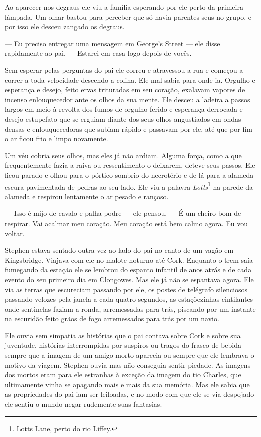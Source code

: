 Ao aparecer nos degraus ele viu a família esperando por ele perto da
primeira lâmpada. Um olhar bastou para perceber que só havia parentes
seus no grupo, e por isso ele desceu zangado os degraus.

 --- Eu preciso entregar uma mensagem em George’s Street --- ele disse rapidamente ao pai. --- Estarei em casa logo depois de vocês.

Sem esperar pelas perguntas do pai ele correu e atravessou a rua e
começou a correr a toda velocidade descendo a colina. Ele mal sabia para onde
ia. Orgulho e esperança e desejo, feito ervas trituradas em seu
coração, exalavam vapores de incenso enlouquecedor ante os olhos da sua
mente. Ele desceu a ladeira a passos largos em meio à revolta dos fumos
de orgulho ferido e esperança derrocada e desejo estupefato que se
erguiam diante dos seus olhos angustiados em ondas densas e
enlouquecedoras que subiam rápido e passavam por ele, até que por fim o
ar ficou frio e limpo novamente.

Um véu cobria seus olhos, mas eles já não ardiam. Alguma força, como a
que frequentemente fazia a raiva ou ressentimento o deixarem, deteve
seus passos. Ele ficou parado e olhou para o pórtico sombrio do
necrotério e de lá para a alameda escura pavimentada de pedras ao seu
lado. Ele viu a palavra \textit{Lotts}\footnote{ Lotts Lane, perto do
rio Liffey.} na parede da alameda e respirou lentamente o ar pesado e
rançoso.

 --- Isso é mijo de cavalo e palha podre --- ele pensou. --- É um cheiro bom de
respirar. Vai acalmar meu coração. Meu coração está bem calmo agora. Eu
vou voltar.

\asterisc

Stephen estava sentado outra vez ao lado do pai no canto de um vagão
em Kingsbridge. Viajava com ele no malote noturno até Cork. Enquanto o
trem saía fumegando da estação ele se lembrou do espanto infantil de
anos atrás e de cada evento do seu primeiro dia em Clongowes. Mas ele
já não se espantava agora. Ele via as terras que escureciam passando
por ele, os postes de telégrafo silenciosos passando velozes pela
janela a cada quatro segundos, as estaçõezinhas cintilantes onde
sentinelas faziam a ronda, arremessadas para trás, piscando por um
instante na escuridão feito grãos de fogo arremessados para trás por um navio.

Ele ouvia sem simpatia as histórias que o pai contava sobre Cork e sobre
sua juventude, histórias interrompidas por suspiros ou tragos do frasco
de bebida sempre que a imagem de um amigo morto aparecia ou sempre que
ele lembrava o motivo da viagem. Stephen ouvia mas não conseguia
sentir piedade. As imagens dos mortos eram para ele estranhas à exceção
da imagem do tio Charles, que ultimamente vinha se apagando mais e mais
da sua memória. Mas ele sabia que as propriedades do pai iam ser
leiloadas, e no modo com que ele se via despojado ele sentiu o mundo
negar rudemente suas fantasias.

